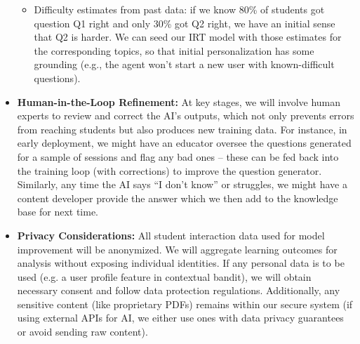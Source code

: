 \documentclass[11pt]{article}
\begin{document}
\begin{itemize}
\begin{itemize}
      \item Difficulty estimates from past data: if we know 80\% of students got question Q1 right and only 30\% got Q2 right, we have an initial sense that Q2 is harder. We can seed our IRT model with those estimates for the corresponding topics, so that initial personalization has some grounding (e.g., the agent won’t start a new user with known-difficult questions).
    \end{itemize}
  \item \textbf{Human-in-the-Loop Refinement:} At key stages, we will involve human experts to review and correct the AI’s outputs, which not only prevents errors from reaching students but also produces new training data. For instance, in early deployment, we might have an educator oversee the questions generated for a sample of sessions and flag any bad ones – these can be fed back into the training loop (with corrections) to improve the question generator. Similarly, any time the AI says “I don’t know” or struggles, we might have a content developer provide the answer which we then add to the knowledge base for next time.
  \item \textbf{Privacy Considerations:} All student interaction data used for model improvement will be anonymized. We will aggregate learning outcomes for analysis without exposing individual identities. If any personal data is to be used (e.g. a user profile feature in contextual bandit), we will obtain necessary consent and follow data protection regulations. Additionally, any sensitive content (like proprietary PDFs) remains within our secure system (if using external APIs for AI, we either use ones with data privacy guarantees or avoid sending raw content).
\end{itemize}
\end{document}
